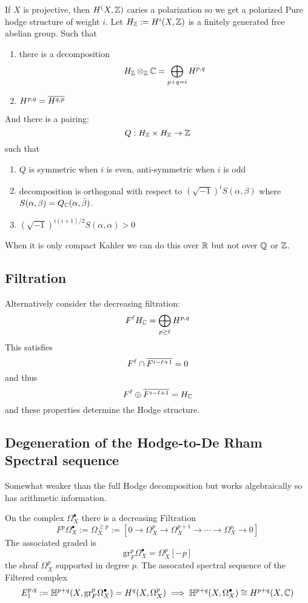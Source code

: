 \documentclass[12pt]{article}
\newcommand{\HH}{\mathbb{H}}
\renewcommand{\gr}{\mathrm{gr}}
\begin{document}
If $X$ is projective, then $H^(X, \mathbb{Z})$ caries a polarization so we get a polarized Pure hodge structure of weight $i$. Let $H_{\mathbb{Z}} := H^i(X, \mathbb{Z})$ is a finitely generated free abelian group. Such that
\begin{enumerate}
\item there is a decomposition
\[ H_{\mathbb{Z}} \otimes_{\mathbb{Z}} \mathbb{C} = \bigoplus_{p+q = i} H^{p,q} \]
\item $H^{p,q} = \overline{H^{q,p}}$
\end{enumerate}
And there is a pairing:
\[ Q : H_{\mathbb{Z}} \times H_{\mathbb{Z}} \to \mathbb{Z} \] 
such that
\begin{enumerate}
\item $Q$ is symmetric when $i$ is even, anti-symmetric when $i$ is odd
\item decomposition is orthogonal with respect to $(\sqrt{-1})^i S(\alpha,\beta)$ where $S(\alpha, \beta) = Q_{\mathbb{C}}(\alpha, \bar{\beta})$. 
\item $(\sqrt{-1})^{i(i+1)/2} S(\alpha, \alpha) > 0$
\end{enumerate}

When it is only compact Kahler we can do this over $\mathbb{R}$ but not over $\mathbb{Q}$ or $\mathbb{Z}$. 

\subsection{Filtration}

Alternatively consider the decreasing filtration:
\[ F^\ell H_{\mathbb{C}} = \bigoplus_{p \ge \ell} H^{p,q} \]
This satisfies
\[ F^\ell \cap \overline{F^{i - \ell + 1}} = 0 \]
and thus 
\[ F^\ell \oplus \overline{F^{i - \ell + 1}} = H_{\mathbb{C}} \]
and these properties determine the Hodge structure. 

\subsection{Degeneration of the Hodge-to-De Rham Spectral sequence}

Somewhat weaker than the full Hodge decomposition but works algebraically so has arithmetic information. 
 
On the complex $\Omega_X^\bullet$ there is a decreasing Filtration
\[ F^p \Omega_X^\bullet := \Omega_X^{\ge p} := [0 \to \Omega_X^p \to \Omega_X^{p+1} \to \cdots \to \Omega_X^n \to 0] \] 
The associated graded is
\[ \gr^p_F \Omega_X^\bullet = \Omega_X^p[-p] \]
the sheaf $\Omega_X^p$ supported in degree $p$. The assocated spectral sequence of the Filtered complex 
\[ E^{p,q}_1 := \HH^{p+q}(X, \gr^p_F \Omega_X^\bullet) = H^q(X, \Omega_X^p) \implies \HH^{p+q}(X, \Omega_X^\bullet) \cong H^{p+q}(X, \CC) \]
\end{document}
